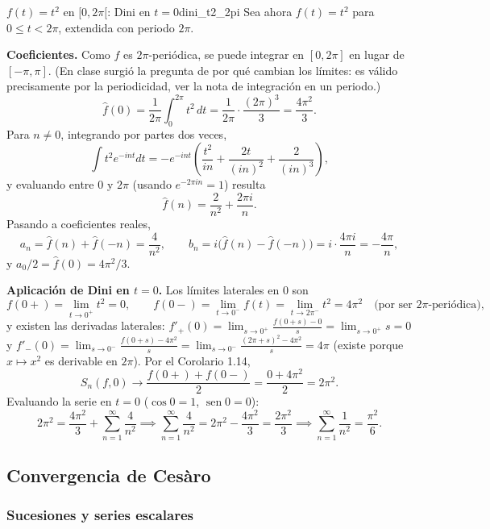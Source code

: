\begin{ejemplo}{$f(t)=t^2$ en $[0,2\pi[$: Dini en $t=0$}{dini_t2_2pi}
Sea ahora $f(t) = t^2$ para $0 \le t < 2\pi$, extendida con periodo $2\pi$.

\textbf{Coeficientes.} Como $f$ es $2\pi$-periódica, se puede integrar en $[0,2\pi]$ en lugar de $[-\pi,\pi]$. (En clase surgió la pregunta de por qué cambian los límites: es válido precisamente por la periodicidad, ver la nota de integración en un periodo.)
\[
\hat{f}(0) = \frac{1}{2\pi} \int_0^{2\pi} t^2 \, dt = \frac{1}{2\pi} \cdot \frac{(2\pi)^3}{3} = \frac{4\pi^2}{3}.
\]
Para $n \ne 0$, integrando por partes dos veces,
\[
\int t^2 e^{-int} dt = -e^{-int}\left( \frac{t^2}{in} + \frac{2t}{(in)^2} + \frac{2}{(in)^3} \right),
\]
y evaluando entre $0$ y $2\pi$ (usando $e^{-2\pi i n} = 1$) resulta
\[
\hat{f}(n) = \frac{2}{n^2} + \frac{2\pi i}{n}.
\]
Pasando a coeficientes reales,
\[
a_n = \hat{f}(n) + \hat{f}(-n) = \frac{4}{n^2}, \qquad b_n = i\big(\hat{f}(n) - \hat{f}(-n)\big) = i \cdot \frac{4\pi i}{n} = -\frac{4\pi}{n},
\]
y $a_0/2 = \hat{f}(0) = 4\pi^2/3$.

\textbf{Aplicación de Dini en $t=0$.} Los límites laterales en $0$ son
\[
f(0+) = \lim_{t \to 0^+} t^2 = 0, \qquad f(0-) = \lim_{t \to 0^-} f(t) = \lim_{t \to 2\pi^-} t^2 = 4\pi^2 \quad \text{(por ser $2\pi$-periódica)},
\]
y existen las derivadas laterales:
$f'_+(0) = \lim_{s \to 0^+} \frac{f(0+s)-0}{s} = \lim_{s\to 0^+} s = 0$ y
$f'_-(0) = \lim_{s \to 0^-} \frac{f(0+s) - 4\pi^2}{s} = \lim_{s\to 0^-} \frac{(2\pi+s)^2 - 4\pi^2}{s} = 4\pi$
(existe porque $x \mapsto x^2$ es derivable en $2\pi$). Por el Corolario 1.14,
\[
S_n(f,0) \to \frac{f(0+) + f(0-)}{2} = \frac{0 + 4\pi^2}{2} = 2\pi^2.
\]
Evaluando la serie en $t=0$ ($\cos 0 = 1$, $\operatorname{sen} 0 = 0$):
\[
2\pi^2 = \frac{4\pi^2}{3} + \sum_{n=1}^\infty \frac{4}{n^2} \implies \sum_{n=1}^\infty \frac{4}{n^2} = 2\pi^2 - \frac{4\pi^2}{3} = \frac{2\pi^2}{3} \implies \sum_{n=1}^\infty \frac{1}{n^2} = \frac{\pi^2}{6}.
\]
\end{ejemplo}

\subsection{Convergencia de Cesàro}

\subsubsection{Sucesiones y series escalares}

